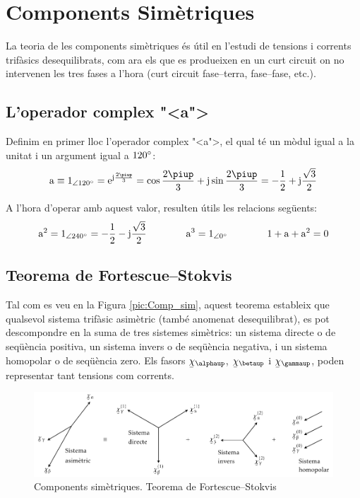 \chapter{Components Sim\`{e}triques} 

La teoria de les components sim\`{e}triques \'{e}s \'{u}til en l'estudi de
tensions i corrents trif\`{a}sics
 desequilibrats, com ara els que es produeixen en un curt circuit on no intervenen les tres
 fases a l'hora (curt circuit fase--terra, fase--fase, etc.).

\section{L'operador complex {"<}a{">}}

Definim en primer lloc l'operador complex {"<}a{">}, el qual t\'{e} un m\`{o}dul
igual a la unitat i un argument igual a $120^\circ$: 
\begin{equation}
   \au \equiv \numpd{1}{120} = \eu^{\ju\frac{2\piup}{3}} =
   \cos \frac{2\piup}{3} + \ju \sin \frac{2\piup}{3} = - \frac{1}{2} + \ju \frac{\sqrt{3}}{2}
\end{equation}

A l'hora d'operar amb aquest valor, resulten \'{u}tils les relacions
seg\"{u}ents:
\begin{equation}
   \mathrm{a}^2 = \num{1}_{\angle\ang{240}}= - \frac{1}{2} - \mathrm{j} \frac{\sqrt{3}}{2}\qquad\qquad
   \mathrm{a}^3 = \num{1}_{\angle\ang{0}} \qquad\qquad
   1+ \mathrm{a} + \mathrm{a}^2 = 0
\end{equation}

\section{\texorpdfstring{Teorema de Fortescue--Stokvis}{Teorema de Fortescue-Stokvis}}

Tal com es veu en la Figura \vref{pic:Comp_sim}, aquest teorema
estableix que qualsevol sistema trif\`{a}sic asim\`{e}tric (tamb\'{e} anomenat
desequilibrat),  es pot descompondre  en la suma de tres sistemes
sim\`{e}trics: un sistema directe o de seq\"{u}\`{e}ncia positiva, un sistema
invers o de seq\"{u}\`{e}ncia negativa, i un sistema homopolar o de
seq\"{u}\`{e}ncia zero. Els fasors $\cmplx{\chi}_\alphaup$,
$\cmplx{\chi}_\betaup$ i $\cmplx{\chi}_\gammaup$, poden representar tant
tensions com corrents.
\begin{figure}[h]
\centering
    \includegraphics{Imatges/Cap-CompSim-CompSim.pdf}
\caption{Components sim\`{e}triques. Teorema de Fortescue--Stokvis}
\label{pic:Comp_sim}
\end{figure}

